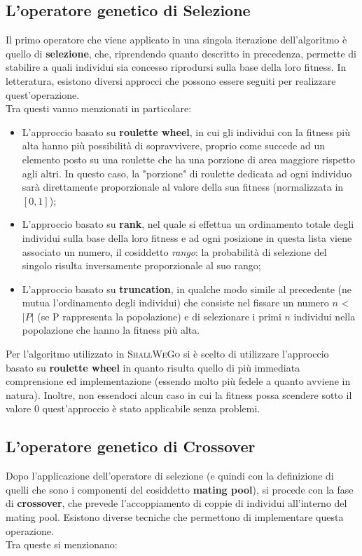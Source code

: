     \subsection{L'operatore genetico di Selezione}
        Il primo operatore che viene applicato in una singola iterazione dell'algoritmo è quello di \textbf{selezione}, che, riprendendo quanto descritto in precedenza, permette di stabilire a quali individui sia concesso riprodursi sulla base della loro fitness. In letteratura, esistono diversi approcci che possono essere seguiti per realizzare quest'operazione. \\
        Tra questi vanno menzionati in particolare:

        \begin{itemize}
            \item L'approccio basato su \textbf{roulette wheel}, in cui gli individui con la fitness più alta hanno più possibilità di sopravvivere, proprio come succede ad un elemento posto su una roulette che ha una porzione di area maggiore rispetto agli altri. In questo caso, la "porzione" di roulette dedicata ad ogni individuo sarà direttamente proporzionale al valore della sua fitness (normalizzata in $[0, 1]$);
            \item L'approccio basato su \textbf{rank}, nel quale si effettua un ordinamento totale degli individui sulla base della loro fitness e ad ogni posizione in questa lista viene associato un numero, il cosiddetto \textit{rango}: la probabilità di selezione del singolo risulta inversamente proporzionale al suo rango;
            \item L'approccio basato su \textbf{truncation}, in qualche modo simile al precedente (ne mutua l'ordinamento degli individui) che consiste nel fissare un numero $n$ < $|P|$ (se P rappresenta la popolazione) e di selezionare i primi $n$ individui nella popolazione che hanno la fitness più alta.
        \end{itemize}

        Per l'algoritmo utilizzato in \textsc{ShallWeGo} si è scelto di utilizzare l'approccio basato su \textbf{roulette wheel} in quanto risulta quello di più immediata comprensione ed implementazione (essendo molto più fedele a quanto avviene in natura). Inoltre, non essendoci alcun caso in cui la fitness possa scendere sotto il valore $0$ quest'approccio è stato applicabile senza problemi.

    \subsection{L'operatore genetico di Crossover}
        Dopo l'applicazione dell'operatore di selezione (e quindi con la definizione di quelli che sono i componenti del cosiddetto \textbf{mating pool}), si procede con la fase di \textbf{crossover}, che prevede l'accoppiamento di coppie di individui all'interno del mating pool. 
        Esistono diverse tecniche che permettono di implementare questa operazione. \\
        Tra queste si menzionano:

